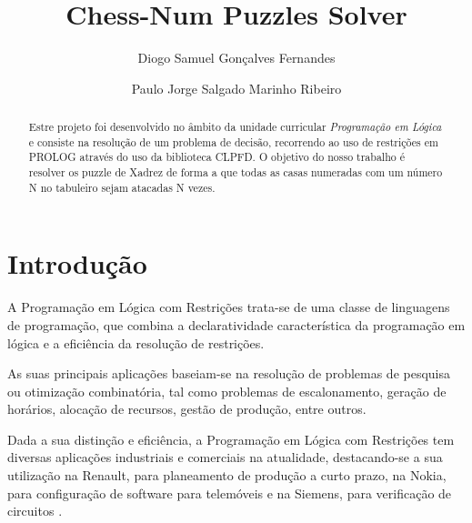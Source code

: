 \documentclass[runningheads]{llncs}
\begin{document}
%
\title{Chess-Num Puzzles Solver}
\author{Diogo Samuel Gonçalves Fernandes \and
Paulo Jorge Salgado Marinho Ribeiro}

%
\maketitle
\begin{abstract}
Estre projeto foi desenvolvido no âmbito da unidade curricular \emph{Programação em Lógica} e consiste na resolução de um problema
de decisão, recorrendo ao uso de restrições em PROLOG através do uso da biblioteca CLPFD. O objetivo do nosso trabalho é resolver
os puzzle de Xadrez de forma a que todas as casas numeradas com um número N no tabuleiro sejam atacadas N vezes.

\end{abstract}

\section{Introdução}
A Programação em Lógica com Restrições trata-se de uma classe de linguagens de programação, que combina a declaratividade característica da programação em lógica
e a eficiência da resolução de restrições. 

As suas principais aplicações baseiam-se na resolução de problemas de pesquisa ou otimização combinatória, 
tal como problemas de escalonamento, geração de horários, alocação de recursos, gestão de produção, entre outros.

Dada a sua distinção e eficiência, a Programação em Lógica com Restrições tem diversas aplicações industriais e comerciais na atualidade, 
destacando-se a sua utilização na Renault, para planeamento de produção a curto prazo, na Nokia, para configuração de software para telemóveis 
e na Siemens, para verificação de circuitos \cite{slides1}.
\end{document}
